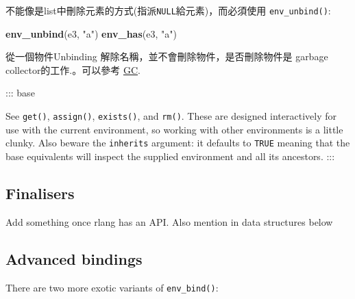 \documentclass[]{book}
\newenvironment{Shaded}{\begin{snugshade}}{\end{snugshade}}
\newcommand{\KeywordTok}[1]{\textcolor[rgb]{0.13,0.29,0.53}{\textbf{#1}}}
\newcommand{\StringTok}[1]{\textcolor[rgb]{0.31,0.60,0.02}{#1}}
\newcommand{\OtherTok}[1]{\textcolor[rgb]{0.56,0.35,0.01}{#1}}
\newcommand{\OperatorTok}[1]{\textcolor[rgb]{0.81,0.36,0.00}{\textbf{#1}}}
\newcommand{\NormalTok}[1]{#1}
\theoremstyle{definition}
\theoremstyle{definition}
\theoremstyle{definition}
\theoremstyle{remark}
\begin{document}
不能像是list中刪除元素的方式(指派\texttt{NULL}給元素)，而必須使用
\texttt{env\_unbind()}:

\begin{Shaded}
\end{Shaded}

\begin{Shaded}
\begin{Highlighting}[]
\KeywordTok{env_unbind}\NormalTok{(e3, }\StringTok{"a"}\NormalTok{)}
\KeywordTok{env_has}\NormalTok{(e3, }\StringTok{"a"}\NormalTok{)}
\end{Highlighting}
\end{Shaded}

從一個物件Unbinding 解除名稱，並不會刪除物件，是否刪除物件是 garbage
collector的工作.。可以參考 \protect\hyperlink{gc}{GC}.

::: base

See \texttt{get()}, \texttt{assign()}, \texttt{exists()}, and
\texttt{rm()}. These are designed interactively for use with the current
environment, so working with other environments is a little clunky. Also
beware the \texttt{inherits} argument: it defaults to \texttt{TRUE}
meaning that the base equivalents will inspect the supplied environment
and all its ancestors. :::

\subsection{Finalisers}\label{finalisers}

{Add something once rlang has an API. Also mention in data structures
below}

\hypertarget{advanced-bindings}{\subsection{Advanced
bindings}\label{advanced-bindings}}

There are two more exotic variants of \texttt{env\_bind()}:
\end{document}
